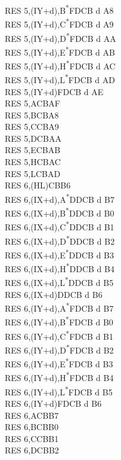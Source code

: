 \documentclass[twoside,openright,a4paper]{book}
\begin{document}
\begin{multicols}{3}
{\begin{tabbing}
	RES 5,(IY+d),B\textsuperscript{*}\>FDCB d A8\\
	RES 5,(IY+d),C\textsuperscript{*}\>FDCB d A9\\
	RES 5,(IY+d),D\textsuperscript{*}\>FDCB d AA\\
	RES 5,(IY+d),E\textsuperscript{*}\>FDCB d AB\\
	RES 5,(IY+d),H\textsuperscript{*}\>FDCB d AC\\
	RES 5,(IY+d),L\textsuperscript{*}\>FDCB d AD\\
	RES 5,(IY+d)\>FDCB d AE\\
	RES 5,A\>CBAF\\
	RES 5,B\>CBA8\\
	RES 5,C\>CBA9\\
	RES 5,D\>CBAA\\
	RES 5,E\>CBAB\\
	RES 5,H\>CBAC\\
	RES 5,L\>CBAD\\
	RES 6,(HL)\>CBB6\\
	RES 6,(IX+d),A\textsuperscript{*}\>DDCB d B7\\
	RES 6,(IX+d),B\textsuperscript{*}\>DDCB d B0\\
	RES 6,(IX+d),C\textsuperscript{*}\>DDCB d B1\\
	RES 6,(IX+d),D\textsuperscript{*}\>DDCB d B2\\
	RES 6,(IX+d),E\textsuperscript{*}\>DDCB d B3\\
	RES 6,(IX+d),H\textsuperscript{*}\>DDCB d B4\\
	RES 6,(IX+d),L\textsuperscript{*}\>DDCB d B5\\
	RES 6,(IX+d)\>DDCB d B6\\
	RES 6,(IY+d),A\textsuperscript{*}\>FDCB d B7\\
	RES 6,(IY+d),B\textsuperscript{*}\>FDCB d B0\\
	RES 6,(IY+d),C\textsuperscript{*}\>FDCB d B1\\
	RES 6,(IY+d),D\textsuperscript{*}\>FDCB d B2\\
	RES 6,(IY+d),E\textsuperscript{*}\>FDCB d B3\\
	RES 6,(IY+d),H\textsuperscript{*}\>FDCB d B4\\
	RES 6,(IY+d),L\textsuperscript{*}\>FDCB d B5\\
	RES 6,(IY+d)\>FDCB d B6\\
	RES 6,A\>CBB7\\
	RES 6,B\>CBB0\\
	RES 6,C\>CBB1\\
	RES 6,D\>CBB2\\

\end{tabbing}}
\end{multicols}
\end{document}
